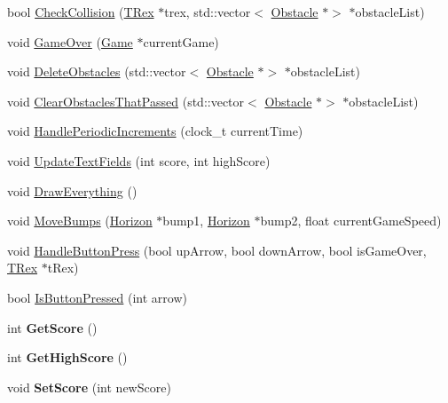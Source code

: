 \begin{DoxyCompactItemize}
bool \mbox{\hyperlink{class_game_a8dcb29f9a319d8686aaa4d32b10272d6}{Check\+Collision}} (\mbox{\hyperlink{class_t_rex}{T\+Rex}} $\ast$trex, std\+::vector$<$ \mbox{\hyperlink{class_obstacle}{Obstacle}} $\ast$$>$ $\ast$obstacle\+List)
\item 
void \mbox{\hyperlink{class_game_a8de397531462daf2c23c300054b0d9ea}{Game\+Over}} (\mbox{\hyperlink{class_game}{Game}} $\ast$current\+Game)
\item 
void \mbox{\hyperlink{class_game_a821eed5ca9d14267db4548842577ba80}{Delete\+Obstacles}} (std\+::vector$<$ \mbox{\hyperlink{class_obstacle}{Obstacle}} $\ast$$>$ $\ast$obstacle\+List)
\item 
void \mbox{\hyperlink{class_game_af993aa3307a6736836b5b970e11e58af}{Clear\+Obstacles\+That\+Passed}} (std\+::vector$<$ \mbox{\hyperlink{class_obstacle}{Obstacle}} $\ast$$>$ $\ast$obstacle\+List)
\item 
void \mbox{\hyperlink{class_game_aa116962af22a3bd888c2d0479c044450}{Handle\+Periodic\+Increments}} (clock\+\_\+t current\+Time)
\item 
void \mbox{\hyperlink{class_game_aace69a639001358fe49feea1018d3d0b}{Update\+Text\+Fields}} (int score, int high\+Score)
\item 
void \mbox{\hyperlink{class_game_ae4d6a13f83743a6df902449bddd6c330}{Draw\+Everything}} ()
\item 
void \mbox{\hyperlink{class_game_a8ce652bb4568b3306301bbfe72bd91e4}{Move\+Bumps}} (\mbox{\hyperlink{class_horizon}{Horizon}} $\ast$bump1, \mbox{\hyperlink{class_horizon}{Horizon}} $\ast$bump2, float current\+Game\+Speed)
\item 
void \mbox{\hyperlink{class_game_a5d149afcdf6ca2a3e232afc7d48ce51c}{Handle\+Button\+Press}} (bool up\+Arrow, bool down\+Arrow, bool is\+Game\+Over, \mbox{\hyperlink{class_t_rex}{T\+Rex}} $\ast$t\+Rex)
\item 
bool \mbox{\hyperlink{class_game_acb69b74ad036b28d4da43111d11e394b}{Is\+Button\+Pressed}} (int arrow)
\item 
\mbox{\label{class_game_a19258e358fc67ddc10bfcc2f2751276a}} 
int {\bfseries Get\+Score} ()
\item 
\mbox{\label{class_game_a30b70d3076897060d5487542ed65fdd7}} 
int {\bfseries Get\+High\+Score} ()
\item 
\mbox{\label{class_game_a3c9e3fb9b9331ab4e9d218a5e4931c71}} 
void {\bfseries Set\+Score} (int new\+Score)
\end{DoxyCompactItemize}
